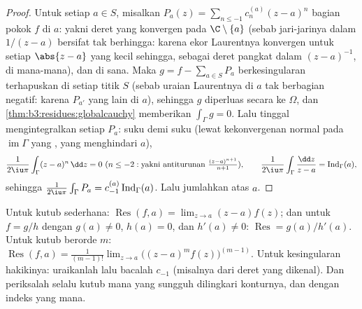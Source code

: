 \begin{proof}
Untuk setiap $a \in S$, misalkan $P_a(z) = \sum_{n\leq-1}c_n^{(a)}(z -
a)^n$ bagian pokok $f$ di $a$: yakni deret yang
konvergen pada $\C\setminus\{a\}$ (sebab jari-jarinya dalam $1/(z-a)$ bersifat
tak berhingga: karena ekor Laurentnya konvergen untuk setiap $\abs{z-a}$ yang kecil
sehingga, sebagai deret pangkat dalam $(z-a)^{-1}$, di mana-mana), dan
 di sana. Maka $g = f - \sum_{a\in S}P_a$ berkesingularan
terhapuskan di setiap titik $S$ (sebab uraian Laurentnya
di $a$ tak berbagian negatif: karena $P_{a'}$ yang lain
 di $a$), sehingga $g$ diperluas secara  ke
$\Omega$, dan \cref{thm:b3:residues:globalcauchy} memberikan
$\int_\Gamma g = 0$. Lalu tinggal mengintegralkan setiap $P_a$:
suku demi suku (lewat kekonvergenan normal pada
$\operatorname{im}\Gamma$ yang , yang menghindari $a$),
\[
\frac1{2\iu\pi}\int_\Gamma(z - a)^n\,\dd z = 0 \ (n \leq -2:
\text{yakni antiturunan } \tfrac{(z-a)^{n+1}}{n+1}),
\qquad
\frac1{2\iu\pi}\int_\Gamma\frac{\dd z}{z - a} =
\operatorname{Ind}_\Gamma(a),
\]
sehingga $\frac1{2\iu\pi}\int_\Gamma P_a =
c_{-1}^{(a)}\operatorname{Ind}_\Gamma(a)$. Lalu jumlahkan atas $a$.
\end{proof}

\begin{method}\label{met:b3:residues:compute}
Untuk kutub sederhana: $\operatorname{Res}(f, a) = \lim_{z\to a}(z -
a)f(z)$; dan untuk $f = g/h$ dengan $g(a) \neq 0$, $h(a) = 0$, dan $h'(a)
\neq 0$: $\operatorname{Res} = g(a)/h'(a)$. Untuk kutub berorde $m$:
$\operatorname{Res}(f, a) = \frac1{(m-1)!}\lim_{z\to
a}\bigl((z-a)^mf(z)\bigr)^{(m-1)}$. Untuk kesingularan hakikinya:
uraikanlah lalu bacalah $c_{-1}$ (misalnya dari deret yang dikenal). Dan periksalah selalu
kutub mana yang sungguh dilingkari konturnya, dan dengan
indeks yang mana.
\end{method}

